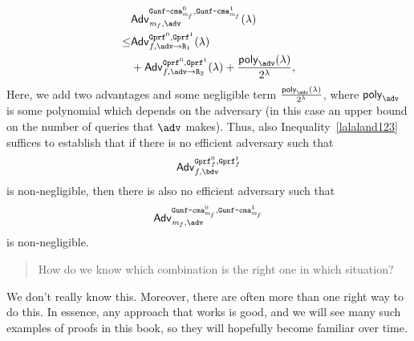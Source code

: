 \begin{align}
   \notag&\mathsf{Adv}^{\M{Gunf\text{-}cma}_{\m_f}^0,\M{Gunf\text{-}cma}_{\m_f}^1}_{\m_f,\adv}(\lambda)\\
   \notag\leq&\mathsf{Adv}^{\M{Gprf}^0,\M{Gprf}^1}_{f,\adv\rightarrow\M{R}_1}(\lambda)\\
	       &\label{lalaland123}+\mathsf{Adv}^{\M{Gprf}^0,\M{Gprf}^1}_{f,\adv\rightarrow\M{R}_2}(\lambda)+\frac{\O{poly}_{\adv}(\lambda)}{2^\lambda},
\end{align}
Here, we add two advantages and some negligible term $\frac{\O{poly}_{\adv}(\lambda)}{2^\lambda}$, where $\O{poly}_{\adv}$ is
some polynomial which depends on the adversary (in this case an upper bound on the number of queries that $\adv$ makes).
Thus, also Inequality~\ref{lalaland123} suffices to establish that if there is no efficient adversary such that 
\[\mathsf{Adv}^{\M{Gprf}_f^0,\M{Gprf}_f^1}_{f,\bdv}\] is non-negligible, then there is also no efficient adversary such
that \[\mathsf{Adv}^{\M{Gunf\text{-}cma}_{\m_f}^0,\M{Gunf\text{-}cma}_{\m_f}^1}_{\m_f,\adv}\] is non-negligible.

\begin{quote}
How do we know which combination is the right one in which situation?
\end{quote}

We don't really know this. Moreover, there are
often more than one right way to do this. In essence, any approach that works is good, and we will see many such
examples of proofs in this book,
 so they will hopefully become familiar over time.

